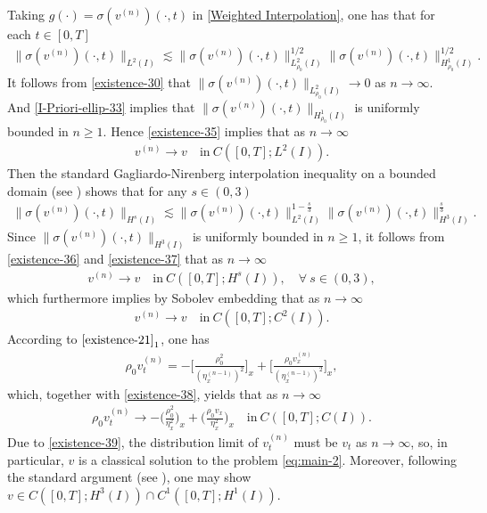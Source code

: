 \documentclass[11pt, reqno]{amsart}
\numberwithin{equation}{section}
\begin{document}
{ Taking \(g(\cdot)=\sigma(v^{(n)})(\cdot,t)\) in \eqref{Weighted Interpolation}, one has that for each \(t\in[0,T]\) 
	\begin{equation}\label{existence-35}
		\begin{aligned}
	\|\sigma(v^{(n)})(\cdot,t)\|_{L^2(I)}\lesssim \|\sigma(v^{(n)})(\cdot,t)\|_{L_{\rho_0}^2(I)}^{1/2}\|\sigma(v^{(n)})(\cdot,t)\|_{H_{\rho_0}^1(I)}^{1/2}.
	\end{aligned}
\end{equation}
It follows from \eqref{existence-30} that \(\|\sigma(v^{(n)})(\cdot,t)\|_{L_{\rho_0}^2(I)}\to 0\) as \(n\to \infty\).
And \eqref{I-Priori-ellip-33} implies that \(\|\sigma(v^{(n)})(\cdot,t)\|_{H_{\rho_0}^1(I)}\) is uniformly bounded in \(n\geq 1\).  Hence \eqref{existence-35} implies that as \(n\to \infty\)
\begin{align}\label{existence-36}
		v^{(n)}\rightarrow v\quad \text{in}\ C([0,T];L^2(I)).
\end{align}	
Then the standard Gagliardo-Nirenberg interpolation inequality on a bounded domain (see \cite{MR3813967}) shows  that for any \(s\in(0,3)\)
\begin{equation}\label{existence-37}
	\begin{aligned}
		\|\sigma(v^{(n)})(\cdot,t)\|_{H^s(I)}\lesssim \|\sigma(v^{(n)})(\cdot,t)\|_{L^2(I)}^{1-\frac{s}{3}}
		\|\sigma(v^{(n)})(\cdot,t)\|_{H^3(I)}^{\frac{s}{3}}.
	\end{aligned}
\end{equation}
Since \(\|\sigma(v^{(n)})(\cdot,t)\|_{H^3(I)}\) is uniformly bounded in \(n\geq 1\),  it follows from \eqref{existence-36} and \eqref{existence-37} that as \(n\to \infty\)
\begin{align*}
	v^{(n)}\rightarrow v\quad \text{in}\ C([0,T];H^s(I)), \quad \forall\ s\in(0,3),
\end{align*}
which furthermore implies by Sobolev embedding that as \(n\to \infty\)
\begin{align}\label{existence-38}
	v^{(n)}\rightarrow v\quad \text{in}\ C([0,T];C^2(I)).
\end{align}
According to \(\eqref{existence-21}_1\), one has 
\begin{equation*}
	\begin{aligned}
		\rho_0v_t^{(n)}=-\bigg[\frac{\rho_0^2}{(\eta_x^{(n-1)})^2}\bigg]_x
		+\bigg[\frac{\rho_0v_x^{(n)}}{(\eta_x^{(n-1)})^2}\bigg]_x,
	\end{aligned}
\end{equation*}
which, together with \eqref{existence-38}, yields that as \(n\to \infty\)
\begin{align}\label{existence-39}
	\rho_0v_t^{(n)}\rightarrow -\bigg(\frac{\rho_0^2}{\eta_x^2}\bigg)_x
	+\bigg(\frac{\rho_0v_x}{\eta_x^2}\bigg)_x\quad \text{in}\ C([0,T];C(I)).
\end{align}
Due to \eqref{existence-39}, the
distribution limit of \(v_t^{(n)}\) must be \(v_t\) as \(n\to \infty\), so, in particular, \(v\) is a classical solution to the problem \eqref{eq:main-2}.
Moreover, following the standard argument (see \cite{MR1867882}), one may show \(v\in C([0,T]; H^3(I))\cap C^1([0,T]; H^1(I))\). 


}
\end{document}
